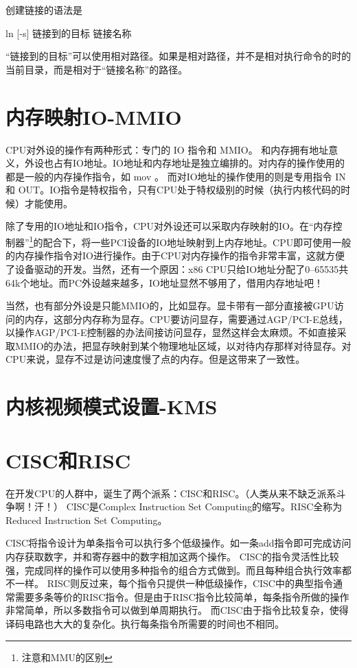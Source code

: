 创建链接的语法是

\begin{code}
ln [-s] 链接到的目标 链接名称
\end{code}


“链接到的目标”可以使用相对路径。如果是相对路径，并不是相对执行命令的时的当前目录，而是相对于“链接名称”的路径。

\section{内存映射IO-MMIO}\label{FAQ:MMIO}

CPU对外设的操作有两种形式：专门的 IO 指令和 MMIO。 和内存拥有地址意义，外设也占有IO地址。IO地址和内存地址是独立编排的。对内存的操作使用的都是一般的内存操作指令，如 mov 。
而对IO地址的操作使用的则是专用指令 IN 和 OUT。IO指令是特权指令，只有CPU处于特权级别的时候（执行内核代码的时候）才能使用。

除了专用的IO地址和IO指令，CPU对外设还可以采取内存映射的IO。在“内存控制器”\footnote{注意和MMU的区别}的配合下，将一些PCI设备的IO地址映射到上内存地址。CPU即可使用一般的内存操作指令对IO进行操作。由于CPU对内存操作的指令非常丰富，这就方便了设备驱动的开发。当然，还有一个原因：x86 CPU只给IO地址分配了0--65535共64k个地址。而PC外设越来越多，IO地址显然不够用了，借用内存地址吧！

当然，也有部分外设是只能MMIO的，比如显存。显卡带有一部分直接被GPU访问的内存，这部分内存称为显存。CPU要访问显存，需要通过AGP/PCI-E总线，以操作AGP/PCI-E控制器的办法间接访问显存，显然这样会太麻烦。不如直接采取MMIO的办法，把显存映射到某个物理地址区域，以对待内存那样对待显存。对CPU来说，显存不过是访问速度慢了点的内存。但是这带来了一致性。

\section{内核视频模式设置-KMS}\label{FAQ:KMS}

\section{CISC和RISC}\label{FAQ:CISCandRISC}

在开发CPU的人群中，诞生了两个派系：CISC和RISC。（人类从来不缺乏派系斗争啊！汗！）
CISC是{}Complex Instruction Set Computing{}的缩写。RISC全称为{}Reduced Instruction Set Computing{}。

CISC{}将指令设计为单条指令可以执行多个低级操作。如一条add指令即可完成访问内存获取数字，并和寄存器中的数字相加这两个操作。
CISC的指令灵活性比较强，完成同样的操作可以使用多种指令的组合方式做到。而且每种组合执行效率都不一样。
RISC则反过来，每个指令只提供一种低级操作，CISC中的典型指令通常需要多条等价的RISC指令。但是由于RISC指令比较简单，每条指令所做的操作非常简单，所以多数指令可以做到单周期执行。
而CISC由于指令比较复杂，使得译码电路也大大的复杂化。执行每条指令所需要的时间也不相同。

